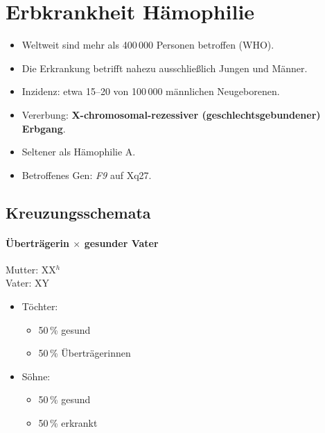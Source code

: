 

\section{Erbkrankheit Hämophilie}\label{sec:erbkrankheit-hamophilie}
\begin{itemize}
    \item Weltweit sind mehr als 400\,000 Personen betroffen (WHO).
    \item Die Erkrankung betrifft nahezu ausschließlich Jungen und Männer.
    \item Inzidenz: etwa 15--20 von 100\,000 männlichen Neugeborenen.
    \item Vererbung: \textbf{X-chromosomal-rezessiver (geschlechtsgebundener) Erbgang}.
\end{itemize}
\begin{itemize}
    \item Seltener als Hämophilie A.
    \item Betroffenes Gen: \textit{F9} auf Xq27.
\end{itemize}

\subsection*{Kreuzungsschemata}\label{subsec:kreuzungsschemata}

\paragraph{Überträgerin $\times$ gesunder Vater}

Mutter: XX$^{h}$ \\
Vater: XY

\begin{itemize}
    \item Töchter:
    \begin{itemize}
        \item 50\,\% gesund
        \item 50\,\% Überträgerinnen
    \end{itemize}
    \item Söhne:
    \begin{itemize}
        \item 50\,\% gesund
        \item 50\,\% erkrankt
    \end{itemize}
\end{itemize}

